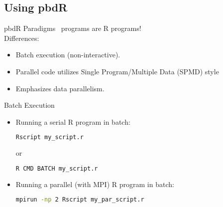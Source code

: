\subsection{Using pbdR}
\makesubcontentsslidessec

\begin{frame}
  \begin{block}{pbdR Paradigms}
  \pbdR\ programs are R programs!\\[.4cm]
  Differences:
  \begin{itemize}[<+-|alert@+>]
   \item Batch execution (non-interactive).
   \item Parallel code utilizes Single Program/Multiple Data (SPMD) style
   \item Emphasizes data parallelism.
   \end{itemize}
  \end{block}
\end{frame}


\begin{frame}[fragile]
  \begin{block}{Batch Execution}\pause
    \begin{itemize}
      \item Running a serial R program in batch:
\vspace{-.4cm}
\begin{lstlisting}[language=sh]
Rscript my_script.r
\end{lstlisting}
or\vspace{-.4cm}
\begin{lstlisting}[language=sh]
R CMD BATCH my_script.r
\end{lstlisting}
      \item Running a parallel (with MPI) R program in batch:
\vspace{-.4cm}
\begin{lstlisting}[language=sh]
mpirun -np 2 Rscript my_par_script.r
\end{lstlisting}
    \end{itemize}
  \end{block}
\end{frame}


